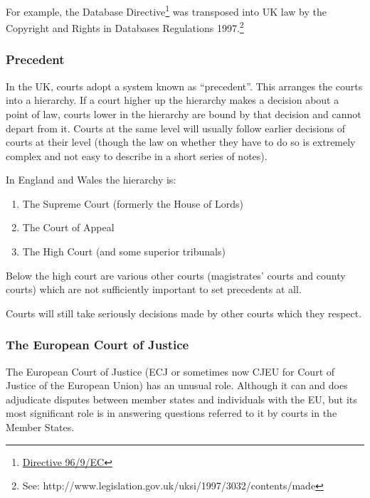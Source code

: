 For example, the Database Directive\footnote{\href{http://eur-lex.europa.eu/smartapi/cgi/sga_doc?smartapi!celexapi!prod!CELEXnumdoc\&numdoc=31996L0009\&model=guichett\&lg=en}{Directive
  96/9/EC}} was transposed into UK law by the Copyright and Rights in
Databases Regulations 1997.\footnote{See:
  http://www.legislation.gov.uk/uksi/1997/3032/contents/made}

\subsubsection{Precedent}\label{precedent}

In the UK, courts adopt a system known as ``precedent''. This arranges
the courts into a hierarchy. If a court higher up the hierarchy makes a
decision about a point of law, courts lower in the hierarchy are bound
by that decision and cannot depart from it. Courts at the same level
will usually follow earlier decisions of courts at their level (though
the law on whether they have to do so is extremely complex and not easy
to describe in a short series of notes).

In England and Wales the hierarchy is:

\begin{enumerate}
\def\labelenumi{\arabic{enumi}.}
\item
  The Supreme Court (formerly the House of Lords)
\item
  The Court of Appeal
\item
  The High Court (and some superior tribunals)
\end{enumerate}

Below the high court are various other courts (magistrates' courts and
county courts) which are not sufficiently important to set precedents at
all.

Courts will still take seriously decisions made by other courts which
they respect.

\subsubsection{The European Court of
Justice}\label{the-european-court-of-justice}

The European Court of Justice (ECJ or sometimes now CJEU for Court of
Justice of the European Union) has an unusual role. Although it can and
does adjudicate disputes between member states and individuals with the
EU, but its most significant role is in answering questions referred to
it by courts in the Member States.

